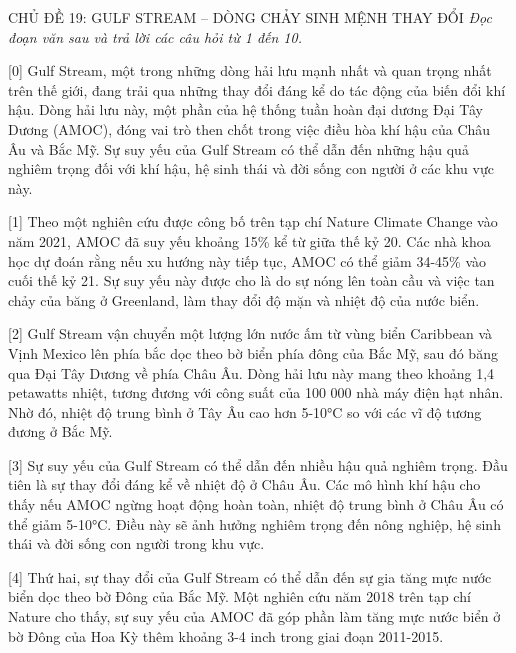\documentclass[12pt,a4paper,twoside]{article}
\newenvironment{readingpassage}[1][]{%
    \begin{tcolorbox}[enhanced, colback=grayLight, colframe=secondaryBlue,
        coltitle=textDark, fonttitle=\bfseries, title={#1},
        rounded corners, arc=3mm, boxrule=1pt,
        left=15pt, right=15pt, top=10pt, bottom=10pt,
        breakable, before skip=10pt, after skip=10pt, drop fuzzy shadow]
    \setstretch{1.3}
}{\end{tcolorbox}}
\begin{document}
\newpage
\label{a_cd19}
\begin{topicbox}{\large CHỦ ĐỀ 19: GULF STREAM -- DÒNG CHẢY SINH MỆNH THAY ĐỔI}
\vspace{8pt}
\textit{Đọc đoạn văn sau và trả lời các câu hỏi từ 1 đến 10.}
\vspace{6pt}
\end{topicbox}
\vspace{5pt}
\begin{readingpassage}[]
[0] Gulf Stream, một trong những dòng hải lưu mạnh nhất và quan trọng nhất trên thế giới, đang trải qua những thay đổi đáng kể do tác động của biến đổi khí hậu. Dòng hải lưu này, một phần của hệ thống tuần hoàn đại dương Đại Tây Dương (AMOC), đóng vai trò then chốt trong việc điều hòa khí hậu của Châu Âu và Bắc Mỹ. Sự suy yếu của Gulf Stream có thể dẫn đến những hậu quả nghiêm trọng đối với khí hậu, hệ sinh thái và đời sống con người ở các khu vực này.

[1] Theo một nghiên cứu được công bố trên tạp chí Nature Climate Change vào năm 2021, AMOC đã suy yếu khoảng 15\% kể từ giữa thế kỷ 20. Các nhà khoa học dự đoán rằng nếu xu hướng này tiếp tục, AMOC có thể giảm 34-45\% vào cuối thế kỷ 21. Sự suy yếu này được cho là do sự nóng lên toàn cầu và việc tan chảy của băng ở Greenland, làm thay đổi độ mặn và nhiệt độ của nước biển.

[2] Gulf Stream vận chuyển một lượng lớn nước ấm từ vùng biển Caribbean và Vịnh Mexico lên phía bắc dọc theo bờ biển phía đông của Bắc Mỹ, sau đó băng qua Đại Tây Dương về phía Châu Âu. Dòng hải lưu này mang theo khoảng 1,4 petawatts nhiệt, tương đương với công suất của 100 000 nhà máy điện hạt nhân. Nhờ đó, nhiệt độ trung bình ở Tây Âu cao hơn 5-10°C so với các vĩ độ tương đương ở Bắc Mỹ.

[3] Sự suy yếu của Gulf Stream có thể dẫn đến nhiều hậu quả nghiêm trọng. Đầu tiên là sự thay đổi đáng kể về nhiệt độ ở Châu Âu. Các mô hình khí hậu cho thấy nếu AMOC ngừng hoạt động hoàn toàn, nhiệt độ trung bình ở Châu Âu có thể giảm 5-10°C. Điều này sẽ ảnh hưởng nghiêm trọng đến nông nghiệp, hệ sinh thái và đời sống con người trong khu vực.

[4] Thứ hai, sự thay đổi của Gulf Stream có thể dẫn đến sự gia tăng mực nước biển dọc theo bờ Đông của Bắc Mỹ. Một nghiên cứu năm 2018 trên tạp chí Nature cho thấy, sự suy yếu của AMOC đã góp phần làm tăng mực nước biển ở bờ Đông của Hoa Kỳ thêm khoảng 3-4 inch trong giai đoạn 2011-2015.


\end{readingpassage}
\end{document}
